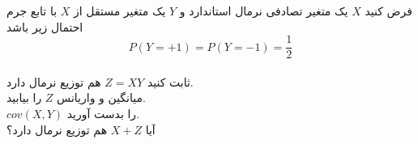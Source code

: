 \problem{}
فرض کنید $X$ یک متغیر تصادفی
نرمال استاندارد 
و $Y$ یک متغیر مستقل از $X$ با تابع جرم احتمال
زیر باشد 
\[
    P(Y = +1) = P(Y = -1) = \frac{1}{2}
\]\\
\subproblem{}
ثابت کنید $Z = XY$ هم توزیع نرمال دارد.\\
\subproblem{}
میانگین و واریانس $Z$ را بیابید.\\
\subproblem{}
$cov(X,Y)$ را بدست آورید.\\
\subproblem{}
آیا $X+Z$ هم توزیع نرمال دارد؟\\